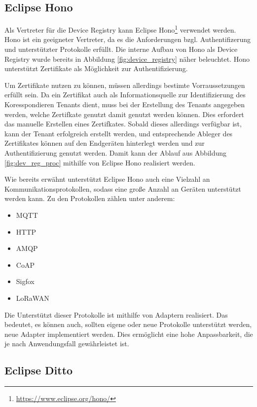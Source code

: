 \subsection{Eclipse Hono}

Als Vertreter für die Device Registry kann Eclipse Hono\footnote{\url{https://www.eclipse.org/hono/}} verwendet werden. Hono ist ein geeigneter Vertreter, da es die Anforderungen bzgl. Authentifizerung und unterstützter Protokolle erfüllt. Die interne Aufbau von Hono als Device Registry wurde bereits in Abbildung \vref{fig:device_registry} näher beleuchtet. Hono unterstützt Zertifikate als Möglichkeit zur Authentifizierung.

Um Zertifikate nutzen zu können, müssen allerdings bestimte Vorraussetzungen erfüllt sein. Da ein Zertifikat auch als Informationsquelle zur Identifizierung des Koresspondieren Tenants dient, muss bei der Erstellung des Tenants angegeben werden, welche Zertifkate genutzt damit genutzt werden können. Dies erfordert das manuelle Erstellen eines Zertifkates. Sobald dieses allerdings verfügbar ist, kann der Tenant erfolgreich erstellt werden, und entsprechende Ableger des Zertifikates können auf den Endgeräten hinterlegt werden und zur Authentifizierung genutzt werden. Damit kann der Ablauf aus Abbildung \vref{fig:dev_reg_proc} mithilfe von Eclipse Hono realisiert werden.

Wie bereits erwähnt unterstützt Eclipse Hono auch eine Vielzahl an Kommunikationsprotokollen, sodass eine große Anzahl an Geräten unterstützt werden kann. Zu den Protokollen zählen unter anderem:

\begin{itemize}
    \item MQTT
    \item HTTP
    \item AMQP
    \item CoAP
    \item Sigfox
    \item LoRaWAN
\end{itemize}

Die Unterstützt dieser Protokolle ist mithilfe von Adaptern realisiert. Das bedeutet, es können auch, sollten eigene oder neue Protokolle unterstützt werden, neue Adapter implementiert werden. Dies ermöglicht eine hohe Anpassbarkeit, die je nach Anwendungsfall gewährleistet ist.

\subsection{Eclipse Ditto}

